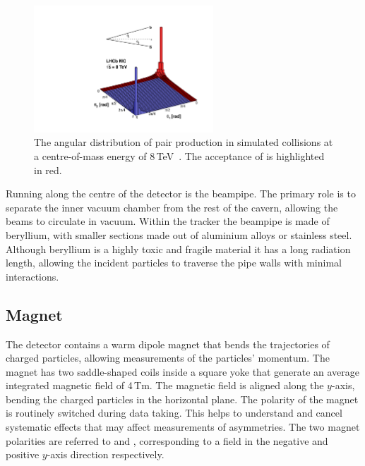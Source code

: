 \begin{figure}[!h]
    \centering
    \includegraphics[width=0.6\textwidth]{figs/Detector/bb_acceptance.pdf}
    \caption{The angular distribution of \bquark\bquarkbar pair production in simulated \proton \proton collisions at a centre-of-mass energy of 8\,TeV~\cite{bbproduction}. The acceptance of \lhcb is highlighted in red.}
    \label{fig:Dec_bb_production}   
\end{figure}


Running along the centre of the detector is the \lhcb beampipe. The primary role is to separate the inner vacuum chamber from the rest of the cavern, allowing the beams to circulate in vacuum. Within the \lhcb tracker the beampipe is made of beryllium, with smaller sections made out of aluminium alloys or stainless steel. Although beryllium is a highly toxic and fragile material it has a long radiation length, allowing the incident particles to traverse the pipe walls with minimal interactions.  


\subsection{Magnet}

The \lhcb detector contains a warm dipole magnet that bends the trajectories of charged particles, allowing measurements of the particles' momentum. The magnet has two saddle-shaped coils inside a square yoke that generate an average integrated magnetic field of 4\,Tm.  
The magnetic field is aligned along the $y$-axis, bending the charged particles in the horizontal plane. The polarity of the magnet is routinely switched during data taking. This helps to understand and cancel systematic effects that may affect measurements of \CP asymmetries. The two magnet polarities are referred to \MagDown and \MagUp, corresponding to a field in the negative and positive $y$-axis direction respectively.   

